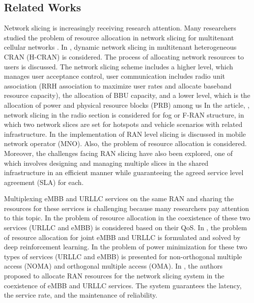 \documentclass[conference]{IEEEtran}
\begin{document}
\subsection{Related Works}
Network slicing is increasingly receiving research attention.
Many researchers studied the problem of resource allocation in network slicing for multitenant cellular networks \cite{feng2020dynamic,lee2018dynamic,lee2016new}.
In \cite{lee2018dynamic}, dynamic network slicing in multitenant heterogeneous CRAN (H-CRAN) is considered. The process of allocating network resources to users is discussed. The network slicing scheme includes a higher level, which manages user acceptance control, user communication includes radio unit association (RRH association to maximize user rates and allocate baseband resource capacity), the allocation of BBU capacity, and a lower level, which is the allocation of power and physical resource blocks (PRB) among us
In the article, \cite{xiang2020realization}, network slicing in the radio section is considered for fog or F-RAN structure, in which two network slices are set for hotspots and vehicle scenarios with related infrastructure. In \cite{elayoubi20195g,d2020toward} the implementation of RAN level slicing is discussed in mobile network operator (MNO). Also, the problem of resource allocation is considered.  Moreover, the challenges facing RAN slicing have also been explored, one of which involves designing and managing multiple slices in the shared infrastructure in an efficient manner while guaranteeing the agreed service level agreement (SLA) for each.


Multiplexing eMBB and URLLC services on the same RAN and sharing the resources for these services is challenging because many researchers pay attention to this topic.
In \cite{setayesh2020joint,yang2020should} the problem of resource allocation in the coexistence of these two services (URLLC and eMBB) is considered based on their QoS. 
In \cite{alsenwi2021intelligent}, the problem of resource allocation for joint eMBB and URLLC is formulated and solved by deep reinforcement learning.
 In \cite{saggese2021power} the problem of power minimization for these two types of services (URLLC and eMBB) is presented for non-orthogonal multiple access (NOMA) and orthogonal multiple access (OMA).
 In \cite{korrai2020ran}, the authors proposed to allocate RAN resources for the network slicing system in the coexistence of eMBB and URLLC services. The system guarantees the latency, the service rate, and the maintenance of reliability.
\end{document}
